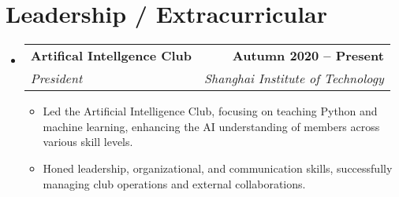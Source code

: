 \documentclass[letterpaper,11pt]{article}
\makeatletter
\newcommand{\resumeItem}[1]{
  \item\small{
    {#1 \vspace{-2pt}}
  }
}
\newcommand{\resumeSubheading}[4]{
  \vspace{-2pt}\item
    \begin{tabular*}{1.0\textwidth}[t]{l@{\extracolsep{\fill}}r}
      \textbf{#1} & \textbf{\small #2} \\
      \textit{\small#3} & \textit{\small #4} \\
    \end{tabular*}\vspace{-7pt}
}
\newcommand{\resumeSubHeadingListStart}{\begin{itemize}[leftmargin=0.0in, label={}]}
\newcommand{\resumeSubHeadingListEnd}{\end{itemize}}
\newcommand{\resumeItemListStart}{\begin{itemize}}
\newcommand{\resumeItemListEnd}{\end{itemize}\vspace{-5pt}}
\makeatother
\begin{document}
\section{Leadership / Extracurricular}
    \resumeSubHeadingListStart
        \resumeSubheading{Artifical Intellgence Club}{Autumn 2020 -- Present}{President}{Shanghai Institute of Technology}
            \resumeItemListStart
                \resumeItem{Led the Artificial Intelligence Club, focusing on teaching Python and machine learning, enhancing the AI understanding of members across various skill levels.}
                \resumeItem{Honed leadership, organizational, and communication skills, successfully managing club operations and external collaborations.}
            \resumeItemListEnd
        
    \resumeSubHeadingListEnd
\end{document}
